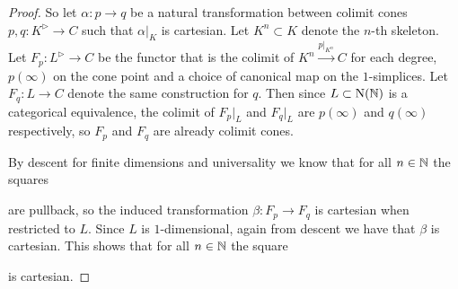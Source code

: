 \begin{lemma}
\begin{proof}
        So let $\alpha\colon p\to q$ be a natural transformation between colimit cones $p,q\colon K^{\rhd}\to C$ such that $\alpha|_K$ is cartesian.
        Let $K^n\subset K$ denote the $n$-th skeleton.
        Let $F_p\colon L^{\rhd}\to C$ be the functor that is the colimit of $K^n\xrightarrow{p|_{K^n}}C$ for each degree, $p(\infty)$ on the cone point and a choice of canonical map on the $1$-simplices.
        Let $F_q\colon L\to C$ denote the same construction for $q$.
        Then since $L\subset\operatorname{N}(\mathbb{N})$ is a categorical equivalence, the colimit of $F_p|_L$ and $F_q|_L$ are $p(\infty)$ and $q(\infty)$ respectively, so $F_p$ and $F_q$ are already colimit cones.

        By descent for finite dimensions and universality we know that for all $n\in\mathbb{N}$ the squares
        \begin{center}
        \end{center}
        are pullback, so the induced transformation $\beta\colon F_p\to F_q$ is cartesian when restricted to $L$.
        Since $L$ is $1$-dimensional, again from descent we have that $\beta$ is cartesian.
        This shows that for all $n\in\mathbb{N}$ the square
        \begin{center}
        \end{center}
        is cartesian.


\end{proof}
\end{lemma}
